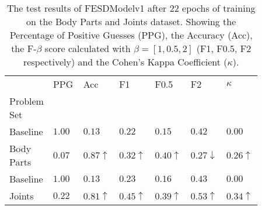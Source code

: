     \begin{table}[!htbp]
        \caption[Test Results of FESDModelv1]{The test results of FESDModelv1 after 22 epochs of training on the Body Parts and Joints dataset. Showing the Percentage of Positive Guesses (PPG), the Accuracy (Acc), the F-$\beta$ score calculated with $\beta = [1, 0.5, 2]$ (F1, F0.5, F2 respectively) and the Cohen's Kappa Coefficient ($\kappa$).}
        \label{tab:hi_res_v1}
        \begin{tabular}{p{0.14\linewidth}p{0.12\linewidth}p{0.12\linewidth}p{0.12\linewidth}p{0.12\linewidth}p{0.12\linewidth}p{0.12\linewidth}}
\hline
{} &   PPG &  Acc &   F1 &  F0.5 &   F2 &  $\kappa$ \\
Problem Set   &       &      &      &       &      &           \\
\hline
\hline
Baseline    & $1.00$ &	$0.13$ &	$0.22$ &	$0.15$ &	$0.42$ &	$0.00$ \\
Body Parts  & $0.07$ &	$0.87\uparrow$ &	$0.32\uparrow$ &	$0.40\uparrow$ &	$0.27\downarrow$ &	$0.26\uparrow$ \\
\hline
Baseline    & $1.00$ &	$0.13$ &	$0.23$ &	$0.16$ & 	$0.43$ &	$0.00$ \\
Joints      & $0.22$ &	$0.81\uparrow$ &	$0.45\uparrow$ &	$0.39\uparrow$ &	$0.53\uparrow$ &	$0.34\uparrow$ \\
\hline
\end{tabular}
\end{table}
  
